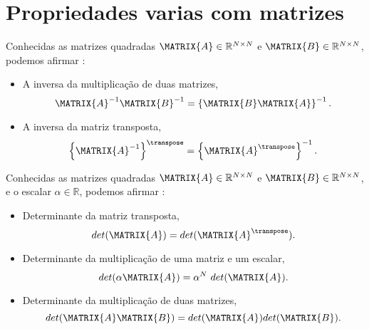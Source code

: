 \section{Propriedades varias com matrizes}


\begin{theorem}\label{theo:matrixgeneric2}
Conhecidas as matrizes quadradas $\MATRIX{A} \in \mathbb{R}^{N \times N}$ e $\MATRIX{B} \in \mathbb{R}^{N \times N}$,
podemos afirmar \cite[pp. 65]{golub2013matrix}:
\begin{itemize}
\item  A inversa da multiplicação de duas matrizes,
\begin{equation}
\MATRIX{A}^{-1} \MATRIX{B}^{-1} = \left\{\MATRIX{B}\MATRIX{A}\right\}^{-1}.
\end{equation}
\item A inversa da matriz transposta,
\begin{equation}
\left\{\MATRIX{A}^{-1}\right\}^{\transpose}  = \left\{\MATRIX{A}^{\transpose}\right\}^{-1}.
\end{equation}
\end{itemize}
\end{theorem}

\begin{theorem}\label{theo:matrixgeneric1}
Conhecidas as matrizes quadradas $\MATRIX{A} \in \mathbb{R}^{N \times N}$ e $\MATRIX{B} \in \mathbb{R}^{N \times N}$,
e o escalar $\alpha \in \mathbb{R}$, podemos afirmar \cite[pp. 66]{golub2013matrix}:
\begin{itemize}
\item Determinante da matriz transposta,
\begin{equation}
det(\MATRIX{A})=det(\MATRIX{A}^{\transpose}).
\end{equation}
\item Determinante da multiplicação de uma matriz e um escalar,
\begin{equation}
det(\alpha \MATRIX{A})=\alpha^N~det(\MATRIX{A}).
\end{equation}
\item Determinante da multiplicação de duas matrizes,
\begin{equation}
det(\MATRIX{A}\MATRIX{B})=det(\MATRIX{A})det(\MATRIX{B}).
\end{equation}
\end{itemize}
\end{theorem}


